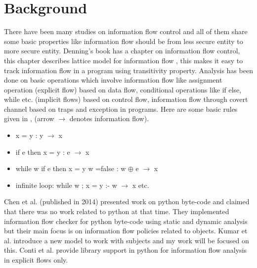\chapter{Background}
\label{ch:bg}
There have been many studies on information flow control and all of them share some basic properties like information flow should be from less secure entity to more secure entity. Denning's book \cite{denning} has a chapter on information flow control, this chapter describes lattice model for information flow \cite{lattice}, this makes it easy to track information flow in a program using transitivity property. Analysis has been done on basic operations which involve information flow like assignment operation (explicit flow) based on data flow, conditional operations like if else, while etc. (implicit flows) based on control flow, information flow through covert channel based on traps and exception in programs. Here are some basic rules given in \cite{denning}, (arrow $\rightarrow$ denotes information flow).  
\begin{itemize}
	\item x = y : y $\rightarrow$ x
	\item if e then x = y : e $\rightarrow$ x
	\item while w {if e then{ x = y} w =false } : w $\oplus$ e $\rightarrow$ x
	\item infinite loop: while w {}; x = y :- w $\rightarrow$ x etc.   
\end{itemize}
Chen et al. \cite{hybrid}(published in 2014) presented work on python byte-code and claimed that there was no work related to python at that time. They implemented information flow checker for python byte-code using static and dynamic analysis but their main focus is on information flow policies related to objects. Kumar et al. \cite{rwfm} introduce a new model to work with subjects and my work will be focused on this. Conti et al. \cite{taint} provide library support in python for information flow analysis in explicit flows only.       
  

